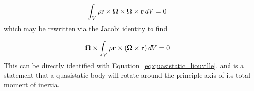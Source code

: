\documentclass[extra,mreferee]{gji}
\newif\ifdetail
\begin{document}
\begin{equation}
\begin{aligned}
\int_V \rho \mathbf{r} \times \mitbf{\Omega} \times \mitbf{\Omega} \times \mathbf{r} \,dV &= 0 \\
\label{eq:quasistatic_angular_momentum}
\end{aligned}
\end{equation}
which may be rewritten via the Jacobi identity to find
\ifdetail
\begin{equation}
\begin{aligned}
- \int_V \rho (\mitbf{\Omega}\times \mathbf{r}) \times ( \mathbf{r} \times \mitbf{\Omega} ) \,dV + 
- \int_V \rho \mitbf{\Omega}\times(\mitbf{\Omega}\times \mathbf{r}) \times \mathbf{r} \,dV &= 0 \\
\end{aligned}
\end{equation}
\fi
\begin{equation}
\begin{aligned}
 \mitbf{\Omega} \times \int_V \rho \mathbf{r} \times (\mitbf{\Omega}\times \mathbf{r}) \,dV &= 0 \\
\end{aligned}
\end{equation}
This can be directly identified with Equation~\eqref{eq:quasistatic_liouville},
and is a statement that a quasistatic body will rotate around the principle axis of its total moment of inertia.
\end{document}
